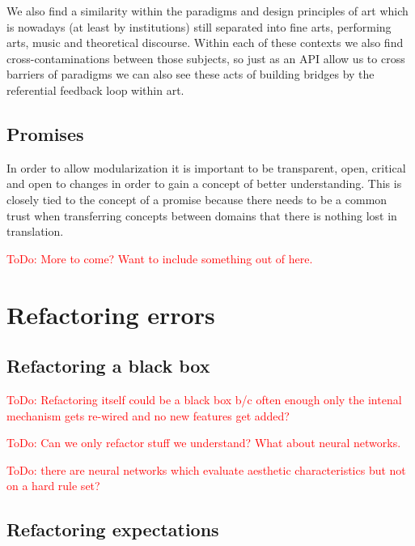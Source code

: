 \documentclass[10pt,twocolumn,letterpaper]{article}
\newcommand\todo[1]{\textcolor{red}{ToDo: #1}}
\begin{document}
We also find a similarity within the paradigms and design principles of art which is nowadays (at least by institutions) still separated into fine arts, performing arts, music and theoretical discourse.
Within each of these contexts we also find cross-contaminations between those subjects, so just as an API allow us to cross barriers of paradigms we can also see these acts of building bridges by the referential feedback loop within art.


\subsection{Promises}

In order to allow modularization it is important to be transparent, open, critical and open to changes in order to gain a concept of better understanding.
This is closely tied to the concept of a promise because there needs to be a common trust when transferring concepts between domains that there is nothing lost in translation.

\todo{More to come? Want to include something out of \cite{bratton_stack_2015}here.}


\section{Refactoring errors}

\subsection{Refactoring a black box}

\todo{Refactoring itself could be a black box b/c often enough only the intenal mechanism gets re-wired and no new features get added?}

\todo{Can we only refactor stuff we understand? What about neural networks.}

\todo{there are neural networks which evaluate aesthetic characteristics but not on a hard rule set?}

\subsection{Refactoring expectations}
\end{document}
